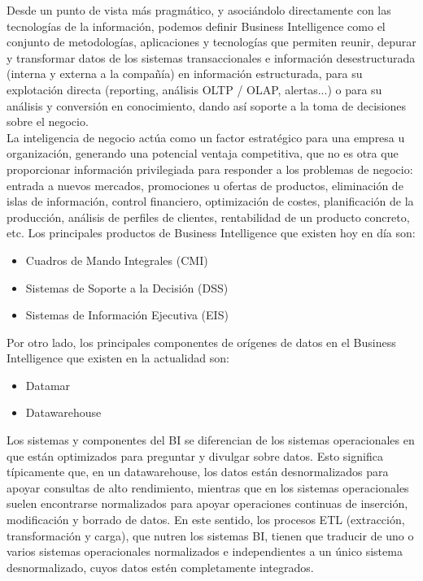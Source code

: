 \documentclass[preprint,12pt]{elsarticle}
\begin{document}
	Desde un punto de vista más pragmático, y asociándolo directamente con las tecnologías de la información, podemos definir Business Intelligence como el conjunto de metodologías, aplicaciones y tecnologías que permiten reunir, depurar y transformar datos de los sistemas transaccionales e información desestructurada (interna y externa a la compañía) en información estructurada, para su explotación directa (reporting, análisis OLTP / OLAP, alertas...) o para su análisis y conversión en conocimiento, dando así soporte a la toma de decisiones sobre el negocio.\cite{bib02:BA:Online} \\
	
	
	La inteligencia de negocio actúa como un factor estratégico para una empresa u organización, generando una potencial ventaja competitiva, que no es otra que proporcionar información privilegiada para responder a los problemas de negocio: entrada a nuevos mercados, promociones u ofertas de productos, eliminación de islas de información, control financiero, optimización de costes, planificación de la producción, análisis de perfiles de clientes, rentabilidad de un producto concreto, etc.
	Los principales productos de Business Intelligence que existen hoy en día son:
	\begin{itemize}
		\item Cuadros de Mando Integrales (CMI)
		\item Sistemas de Soporte a la Decisión (DSS)
		\item Sistemas de Información Ejecutiva (EIS)
	\end{itemize}
	
	Por otro lado, los principales componentes de orígenes de datos en el Business Intelligence que existen en la actualidad son:
	
	\begin{itemize}
		\item Datamar
		\item Datawarehouse
	\end{itemize}
	
	Los sistemas y componentes del BI se diferencian de los sistemas operacionales en que están optimizados para preguntar y divulgar sobre datos. Esto significa típicamente que, en un datawarehouse, los datos están desnormalizados para apoyar consultas de alto rendimiento, mientras que en los sistemas operacionales suelen encontrarse normalizados para apoyar operaciones continuas de inserción, modificación y borrado de datos. En este sentido, los procesos ETL (extracción, transformación y carga), que nutren los sistemas BI, tienen que traducir de uno o varios sistemas operacionales normalizados e independientes a un único sistema desnormalizado, cuyos datos estén completamente integrados.\\
	
\end{document}
